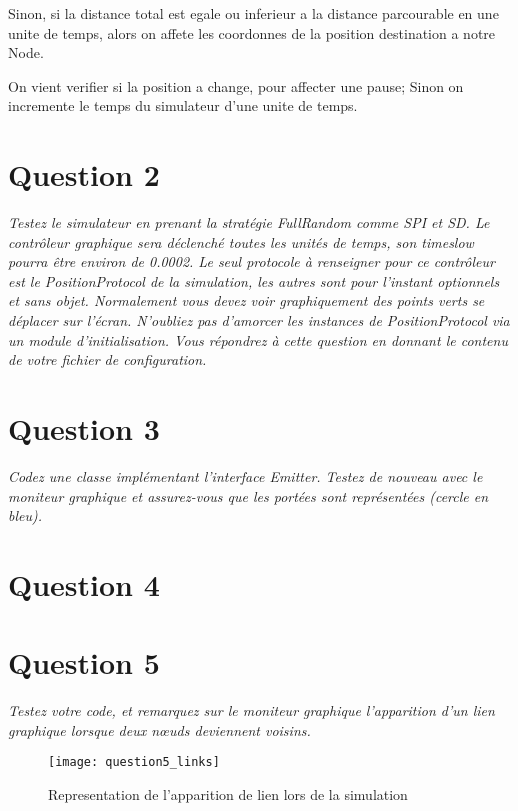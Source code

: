 \documentclass[11pt,a4paper,sans]{report}
\begin{document}
	Sinon, si la distance total est egale ou inferieur a la distance parcourable en une unite de temps, alors on affete les coordonnes de la position destination a notre Node.

	On vient verifier si la position a change, pour affecter une pause; Sinon on incremente le temps du simulateur d'une unite de temps.

	\section{Question 2}
	\textit{Testez le simulateur en prenant la stratégie FullRandom comme SPI et SD. Le contrôleur graphique sera déclenché toutes les unités de temps, son timeslow pourra être environ de 0.0002. Le seul protocole à renseigner pour ce contrôleur est le PositionProtocol de la simulation, les autres sont pour l’instant optionnels et sans objet.  Normalement vous devez voir graphiquement des points verts se déplacer sur l’écran.  N’oubliez pas d’amorcer les instances de PositionProtocol via un module d’initialisation. Vous répondrez à cette question en donnant le contenu de votre fichier de configuration.}

	\newpage
	\section{Question 3}
	\textit{Codez une classe implémentant l’interface Emitter. Testez de nouveau avec le moniteur graphique et assurez-vous que les portées sont représentées (cercle en bleu).}


	\section{Question 4}

	\section{Question 5}
	\par\textit{Testez votre code, et remarquez sur le moniteur graphique l’apparition d’un lien graphique lorsque deux nœuds deviennent voisins.}
	\begin{figure}[h]
		\centering
		\texttt{[image: question5\_links]}
		\caption{Representation de l'apparition de lien lors de la simulation}
		\label{fig:mesh1}
	\end{figure}
\end{document}
